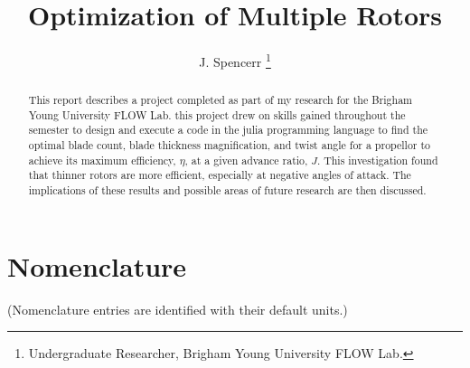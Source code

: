 \documentclass[journal ]{new-aiaa}
\title{Optimization of Multiple Rotors}
\author{J. Spencerr \footnote{Undergraduate Researcher, Brigham Young University FLOW Lab.}}
\affil{Brigham Young University, Provo, Utah, 84601} %
\begin{document}
\maketitle

\begin{abstract}
This report describes a project completed as part of my research for the Brigham Young University FLOW Lab. this project drew on skills gained throughout the semester to design and execute a code in the julia programming language to find the optimal blade count, blade thickness magnification, and twist angle for a propellor to achieve its maximum efficiency, $\eta$, at a given advance ratio, $J$. This investigation found that thinner rotors are more efficient, especially at negative angles of attack. The implications of these results and possible areas of future research are then discussed.

\end{abstract}


\section*{Nomenclature}

\noindent(Nomenclature entries are identified with their default units.)
\end{document}
